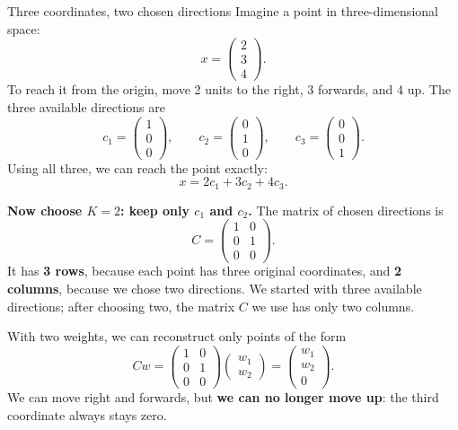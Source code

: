 \documentclass[a4paper,12pt,oneside]{report}
\begin{document}
\begin{framedexample}{Three coordinates, two chosen directions}
Imagine a point in three-dimensional space:
\[
  x=\begin{pmatrix}2\\3\\4\end{pmatrix}.
\]
To reach it from the origin, move 2 units to the right, 3 forwards,
and 4 up. The three available directions are
\[
  c_1=\begin{pmatrix}1\\0\\0\end{pmatrix},\qquad
  c_2=\begin{pmatrix}0\\1\\0\end{pmatrix},\qquad
  c_3=\begin{pmatrix}0\\0\\1\end{pmatrix}.
\]
Using all three, we can reach the point exactly:
\[
  x=2c_1+3c_2+4c_3.
\]

\textbf{Now choose $K=2$: keep only $c_1$ and $c_2$.}
The matrix of chosen directions is
\[
  C=\begin{pmatrix}1&0\\0&1\\0&0\end{pmatrix}.
\]
It has \textbf{3 rows}, because each point has three original
coordinates, and \textbf{2 columns}, because we chose two directions.
We started with three available directions; after choosing two,
the matrix $C$ we use has only two columns.

With two weights, we can reconstruct only points of the form
\[
  Cw=\begin{pmatrix}1&0\\0&1\\0&0\end{pmatrix}
      \begin{pmatrix}w_1\\w_2\end{pmatrix}
     =\begin{pmatrix}w_1\\w_2\\0\end{pmatrix}.
\]
We can move right and forwards, but \textbf{we can no longer move
up}: the third coordinate always stays zero.


\end{framedexample}
\end{document}
